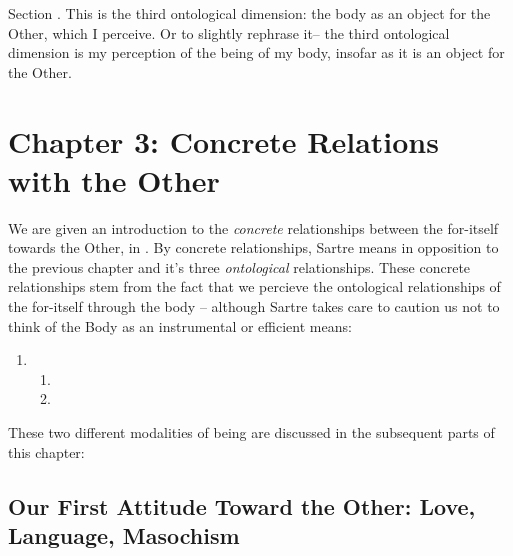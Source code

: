 Section \autocite[468 -- 478]{sartre}. This is the third ontological dimension: the body as an object for the Other, which I perceive. Or to slightly rephrase it-- the third ontological dimension is my perception of the being of my body, insofar as it is an object for the Other.

\section{Chapter 3: Concrete Relations with the Other}

We are given an introduction to the \emph{concrete} relationships between the for-itself towards the Other, in \autocite[479 -- 482]{sartre}. By concrete relationships, Sartre means in opposition to the previous chapter and it's three \emph{ontological} relationships. These concrete relationships stem from the fact that we percieve the ontological relationships of the for-itself through the body -- although Sartre takes care to caution us not to think of the Body as an instrumental or efficient means: 

\begin{enumerate}
  \item {}
  \begin{enumerate}
    \item {}
    \item {}
  \end{enumerate}
\end{enumerate}

\noindent
These two different modalities of being are discussed in the subsequent parts of this chapter:

\subsection{Our First Attitude Toward the Other: Love, Language, Masochism}

